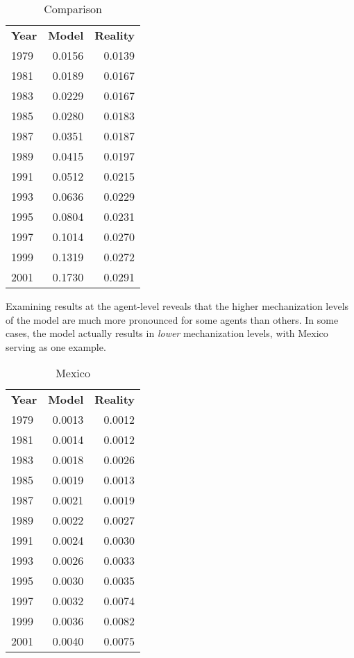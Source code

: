 \documentclass{article}
\begin{document}
\begin{table}[h]
	\centering
	\caption{Comparison}
	\begin{tabular}{|l r r|}
		\hline
		\textbf{Year} & \textbf{Model} & \textbf{Reality} \\
		1979 & 0.0156 & 0.0139 \\
		1981 & 0.0189 & 0.0167 \\
		1983 & 0.0229 & 0.0167 \\
		1985 & 0.0280 & 0.0183 \\
		1987 & 0.0351 & 0.0187 \\
		1989 & 0.0415 & 0.0197 \\
		1991 & 0.0512 & 0.0215 \\
		1993 & 0.0636 & 0.0229 \\
		1995 & 0.0804 & 0.0231 \\
		1997 & 0.1014 & 0.0270 \\
		1999 & 0.1319 & 0.0272 \\
		2001 & 0.1730 & 0.0291 \\
		\hline
	\end{tabular}
\end{table}

\newpage

Examining results at the agent-level reveals that the higher mechanization
levels of the model are much more pronounced for some agents than others. In
some cases, the model actually results in \textit{lower} mechanization levels,
with Mexico serving as one example. 

\begin{table}[h]
	\centering
	\caption{Mexico}
	\begin{tabular}{|l r r|}
		\hline
		\textbf{Year} & \textbf{Model} & \textbf{Reality} \\
		1979 & 0.0013 & 0.0012 \\
		1981 & 0.0014 & 0.0012 \\
		1983 & 0.0018 & 0.0026 \\
		1985 & 0.0019 & 0.0013 \\
		1987 & 0.0021 & 0.0019 \\
		1989 & 0.0022 & 0.0027 \\
		1991 & 0.0024 & 0.0030 \\
		1993 & 0.0026 & 0.0033 \\
		1995 & 0.0030 & 0.0035 \\
		1997 & 0.0032 & 0.0074 \\
		1999 & 0.0036 & 0.0082 \\
		2001 & 0.0040 & 0.0075 \\
		\hline
	\end{tabular}
\end{table}
\end{document}
